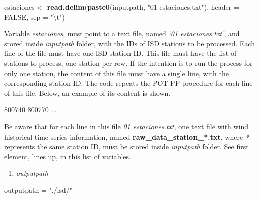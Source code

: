 \documentclass[12pt,oneside]{reedthesis}
\newenvironment{Shaded}{\begin{snugshade}}{\end{snugshade}}
\newcommand{\CharTok}[1]{\textcolor[rgb]{0.31,0.60,0.02}{#1}}
\newcommand{\DataTypeTok}[1]{\textcolor[rgb]{0.13,0.29,0.53}{#1}}
\newcommand{\ExtensionTok}[1]{#1}
\newcommand{\KeywordTok}[1]{\textcolor[rgb]{0.13,0.29,0.53}{\textbf{#1}}}
\newcommand{\NormalTok}[1]{#1}
\newcommand{\OtherTok}[1]{\textcolor[rgb]{0.56,0.35,0.01}{#1}}
\newcommand{\StringTok}[1]{\textcolor[rgb]{0.31,0.60,0.02}{#1}}
\providecommand{\tightlist}{%
  \setlength{\itemsep}{0pt}\setlength{\parskip}{0pt}}
\begin{document}
\vspace{0.4cm}
\begin{Shaded}
\begin{Highlighting}[]
\NormalTok{      estaciones <-}\StringTok{ }\KeywordTok{read.delim}\NormalTok{(}\KeywordTok{paste0}\NormalTok{(inputpath, }\StringTok{"01 estaciones.txt"}\NormalTok{), }
        \DataTypeTok{header =} \OtherTok{FALSE}\NormalTok{, }\DataTypeTok{sep =} \StringTok{"}\CharTok{\textbackslash{}t}\StringTok{"}\NormalTok{)}
\end{Highlighting}
\end{Shaded}
\normalsize

Variable \emph{estaciones}, must point to a text file, named \emph{`01 estaciones.txt'}, and stored inside \emph{inputpath} folder, with the IDs of ISD stations to be processed. Each line of the file must have one ISD station ID. This file must have the list of stations to process, one station per row. If the intention is to run the process for only one station, the content of this file must have a single line, with the corresponding station ID. The code repeats the POT-PP procedure for each line of this file. Below, an example of its content is shown.

\scriptsize

\vspace{0.4cm}
\begin{Shaded}
\begin{Highlighting}[]
      \ExtensionTok{800740}
      \ExtensionTok{800770}
      \ExtensionTok{...}
\end{Highlighting}
\end{Shaded}
\normalsize

Be aware that for each line in this file \emph{01 estaciones.txt}, one text file with wind historical time series information, named \textbf{raw\_data\_station\_*.txt}, where \emph{*} represents the same station ID, must be stored inside \emph{inputpath} folder. See first element, lines up, in this list of variables.
\begin{enumerate}
\def\labelenumi{\arabic{enumi}.}
\setcounter{enumi}{2}
\tightlist
\item
  \emph{outputpath}
\end{enumerate}
\scriptsize

\vspace{0.4cm}
\begin{Shaded}
\begin{Highlighting}[]
\NormalTok{      outputpath =}\StringTok{ "./isd/"}
\end{Highlighting}
\end{Shaded}
\normalsize
\end{document}
